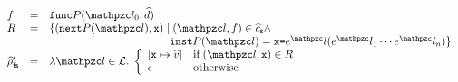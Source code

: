 \documentclass[10pt,conference]{IEEEtran}
\begin{document}
\begin{itemize}
\[\begin{array}{lcl}
        \func &=& \getfunc{\prog}(\lab_0, \aelem)\\
        R &=& \{ (\getnext{\prog}(\lab), \varx) \mid
          (\lab, \func) \in \ascall \wedge\\&&

          \phantom{\{ (\getnext{\prog}(\lab), \varx) \mid}
          \getinst{\prog}(\lab) = \varx \kweq \expr^\lab (\expr^\lab_1 \cdots
          \expr^\lab_n)
        \}\\

        \afsenv' &=& \lambda \lab \in \labset. \; \left\{
          \begin{array}{ll}
            [\varx \mapsto \aval]
            & \text{if} \; (\lab, \varx) \in R\\

            \epsilon
            & \text{otherwise}\\
          \end{array}
        \right.\\
      \end{array}
    \]
\end{itemize}
\end{document}
